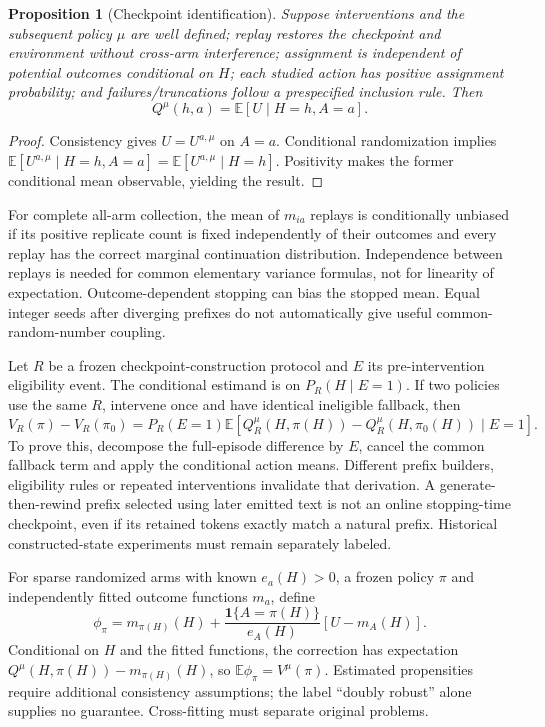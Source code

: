 \documentclass[11pt]{article}
\newtheorem{proposition}{Proposition}
\begin{document}
\begin{proposition}[Checkpoint identification]
Suppose interventions and the subsequent policy $\mu$ are well defined; replay restores the checkpoint and environment without cross-arm interference; assignment is independent of potential outcomes conditional on $H$; each studied action has positive assignment probability; and failures/truncations follow a prespecified inclusion rule. Then
\[
Q^\mu(h,a)=\mathbb E[U\mid H=h,A=a].
\]
\end{proposition}
\begin{proof}
Consistency gives $U=U^{a,\mu}$ on $A=a$. Conditional randomization implies
$\mathbb E[U^{a,\mu}\mid H=h,A=a]=\mathbb E[U^{a,\mu}\mid H=h]$.
Positivity makes the former conditional mean observable, yielding the result.
\end{proof}
For complete all-arm collection, the mean of $m_{ia}$ replays is conditionally unbiased if its positive replicate count is fixed independently of their outcomes and every replay has the correct marginal continuation distribution. Independence between replays is needed for common elementary variance formulas, not for linearity of expectation. Outcome-dependent stopping can bias the stopped mean. Equal integer seeds after diverging prefixes do not automatically give useful common-random-number coupling.

Let $R$ be a frozen checkpoint-construction protocol and $E$ its pre-intervention eligibility event. The conditional estimand is on $P_R(H\mid E=1)$. If two policies use the same $R$, intervene once and have identical ineligible fallback, then
\[
V_R(\pi)-V_R(\pi_0)=P_R(E=1)\mathbb E[Q_R^\mu(H,\pi(H))-Q_R^\mu(H,\pi_0(H))\mid E=1].
\]
To prove this, decompose the full-episode difference by $E$, cancel the common fallback term and apply the conditional action means. Different prefix builders, eligibility rules or repeated interventions invalidate that derivation. A generate-then-rewind prefix selected using later emitted text is not an online stopping-time checkpoint, even if its retained tokens exactly match a natural prefix. Historical constructed-state experiments must remain separately labeled.

For sparse randomized arms with known $e_a(H)>0$, a frozen policy $\pi$ and independently fitted outcome functions $m_a$, define
\[
\phi_\pi=m_{\pi(H)}(H)+\frac{\mathbf1\{A=\pi(H)\}}{e_A(H)}[U-m_A(H)].
\]
Conditional on $H$ and the fitted functions, the correction has expectation $Q^\mu(H,\pi(H))-m_{\pi(H)}(H)$, so $\mathbb E\phi_\pi=V^\mu(\pi)$. Estimated propensities require additional consistency assumptions; the label ``doubly robust'' alone supplies no guarantee. Cross-fitting must separate original problems.
\end{document}
